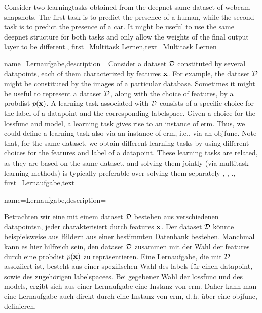 {{{{{{		 Consider two \gls{learningtask}s obtained from the  \gls{deepnet} 
		same \gls{dataset} of webcam snapshots. The first task is to predict the presence 
		of a human, while the second task is to predict the presence of a car. It might be useful 
		to use the same \gls{deepnet} structure for both tasks and only allow the \gls{weights} of 
		the final output layer to be different.},
	first={Multitask Lernen},text={Multitask Lernen}
}

{name={Lernaufgabe},description=
	{Consider a \gls{dataset} $\mathcal{D}$ constituted by several \gls{datapoint}s, each of them 
		characterized by \gls{feature}s ${\bf x}$. For example, the \gls{dataset} $\mathcal{D}$ 
		might be constituted by the images of a particular database. Sometimes it might be useful 
		to represent a \gls{dataset} $\mathcal{D}$, along with the choice of \gls{feature}s, by a \gls{probdist} $p({\bf x})$. 
		A learning task associated with $\mathcal{D}$ consists of a specific 
		choice for the \gls{label} of a \gls{datapoint} and the corresponding \gls{labelspace}. 
		Given a choice for the \gls{lossfunc} and \gls{model}, a learning task gives rise to an 
		instance of \gls{erm}. Thus, we could define a learning task also via an instance of \gls{erm}, i.e., 
		via an \gls{objfunc}. Note that, for the same \gls{dataset}, we obtain different learning tasks by using 
		different choices for the \gls{feature}s and \gls{label} of a \gls{datapoint}. These learning 
		tasks are related, as they are based on the same \gls{dataset}, and solving them jointly 
		(via \gls{multitask learning} methods) is typically preferable over solving them separately \cite{Caruana:1997wk}, \cite{JungGaphLassoSPL}, \cite{CSGraphSelJournal}.},
	first={Lernaufgabe},text={{name={Lernaufgabe},description=
			{Betrachten wir eine   mit einem  \gls{dataset} $\mathcal{D}$ bestehen aus verschiedenen  \glspl{datapoint}n, jeder charakterisiert durch  \glspl{feature}  ${\bf x}$. 
				Der \gls{dataset} $\mathcal{D}$  könnte beispielsweise aus Bildern aus einer bestimmten Datenbank bestehen. 
				Manchmal kann es hier hilfreich sein, den  \gls{dataset} $\mathcal{D}$ zusammen mit der Wahl der  \glspl{feature} durch eine  \gls{probdist} $p({\bf x})$ zu repräsentieren. 
				Eine Lernaufgabe, die mit  $\mathcal{D}$ assoziiert ist, besteht aus einer spezifischen Wahl des \gls{label}s für einen \gls{datapoint}, sowie des zugehörigen  \gls{labelspace}es. 
				Bei gegebener Wahl der  \gls{lossfunc} und des \gls{model}s, ergibt sich aus einer Lernaufgabe eine Instanz 
				von \gls{erm}. Daher kann man eine Lernaufgabe auch direkt durch eine Instanz von \gls{erm}, 
				d. h. über eine \gls{objfunc}, definieren.
				
}}}}}}}}
